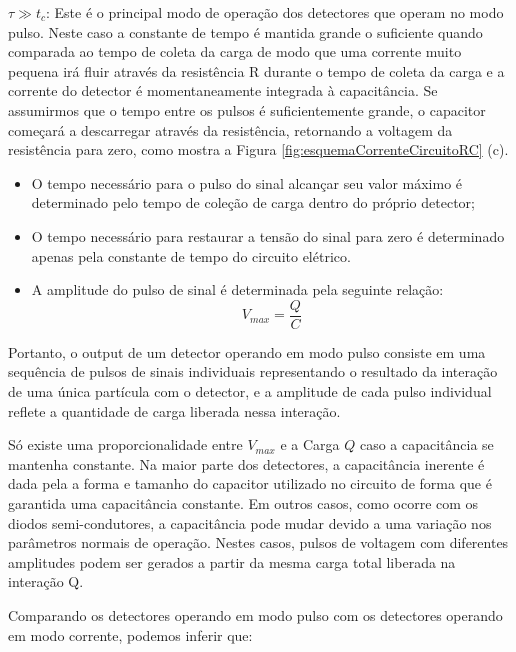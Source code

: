 \documentclass[11pt,a4paper]{article}
\begin{document}
			$\tau \gg t_c$: Este é o principal modo de operação dos detectores que operam no modo pulso. Neste caso a constante de tempo é mantida grande o suficiente quando comparada ao tempo de coleta da carga de modo que uma corrente muito pequena irá fluir através da resistência R durante o tempo de coleta da carga e a corrente do detector é momentaneamente integrada à capacitância. Se assumirmos que o tempo entre os pulsos é suficientemente grande, o capacitor começará a descarregar através da resistência, retornando a voltagem da resistência para zero, como mostra a Figura \ref{fig:esquemaCorrenteCircuitoRC} (c).


			\begin{itemize}
				\item O tempo necessário para o pulso do sinal alcançar seu valor máximo é determinado pelo tempo de coleção de carga dentro do próprio detector;
				\item O tempo necessário para restaurar a tensão do sinal para zero é determinado apenas pela constante de tempo do circuito elétrico.
				\item A amplitude do pulso de sinal é determinada pela seguinte relação:
					\begin{equation}
						V_{max} = \frac{Q}{C}
					\end{equation}
			\end{itemize}

			Portanto, o output de um detector operando em modo pulso consiste em uma sequência de pulsos de sinais individuais representando o resultado da interação de uma única partícula com o detector, e a amplitude de cada pulso individual reflete a quantidade de carga liberada nessa interação.

			Só existe uma proporcionalidade entre $V_{max}$ e a Carga $Q$ caso a capacitância se mantenha constante. Na maior parte dos detectores, a capacitância inerente é dada pela a forma e tamanho do capacitor utilizado no circuito de forma que é garantida uma capacitância constante. Em outros casos, como ocorre com os diodos semi-condutores, a capacitância pode mudar devido a uma variação nos parâmetros normais de operação. Nestes casos, pulsos de voltagem com diferentes amplitudes podem ser gerados a partir da mesma carga total liberada na interação Q. 

			Comparando os detectores operando em modo pulso com os detectores operando em modo corrente, podemos inferir que:
\end{document}
